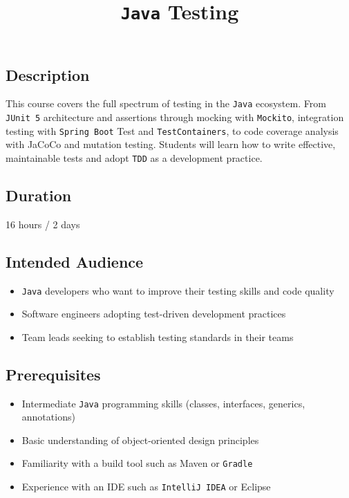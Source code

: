 \documentclass[
]{article}
\title{\texttt{Java} Testing}
\author{}
\date{}
\providecommand{\tightlist}{%
  \setlength{\itemsep}{0pt}\setlength{\parskip}{0pt}}
\begin{document}
\maketitle

\subsection{Description}\label{description}

This course covers the full spectrum of testing in the \texttt{Java}
ecosystem. From \texttt{JUnit\ 5} architecture and assertions through
mocking with \texttt{Mockito}, integration testing with
\texttt{Spring\ Boot} Test and \texttt{TestContainers}, to code coverage
analysis with JaCoCo and mutation testing. Students will learn how to
write effective, maintainable tests and adopt \texttt{TDD} as a
development practice.

\subsection{Duration}\label{duration}

16 hours / 2 days

\subsection{Intended Audience}\label{intended-audience}

\begin{itemize}
\tightlist
\item
  \texttt{Java} developers who want to improve their testing skills and
  code quality
\item
  Software engineers adopting test-driven development practices
\item
  Team leads seeking to establish testing standards in their teams
\end{itemize}

\subsection{Prerequisites}\label{prerequisites}

\begin{itemize}
\tightlist
\item
  Intermediate \texttt{Java} programming skills (classes, interfaces,
  generics, annotations)
\item
  Basic understanding of object-oriented design principles
\item
  Familiarity with a build tool such as Maven or \texttt{Gradle}
\item
  Experience with an IDE such as \texttt{IntelliJ\ IDEA} or Eclipse
\end{itemize}
\end{document}
